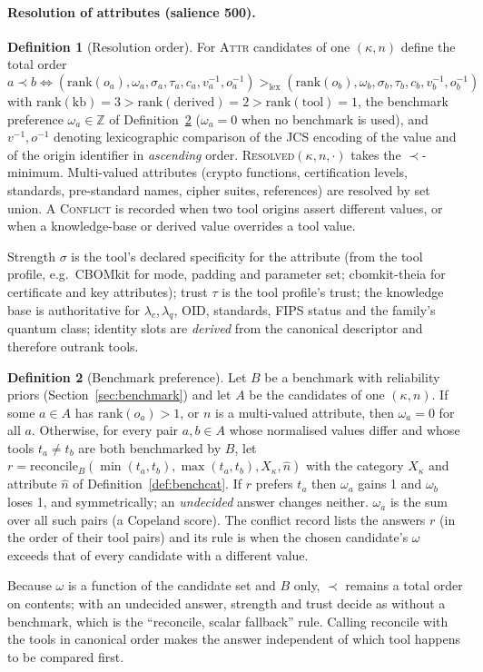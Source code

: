 \documentclass[11pt,a4paper]{article}
\theoremstyle{definition}
\newtheorem{definition}{Definition}[section]
\theoremstyle{plain}
\begin{document}
\paragraph{Resolution of attributes (salience 500).}
\begin{definition}[Resolution order]\label{def:order}
For \textsc{Attr} candidates of one $(\kappa, n)$ define the total order
$$a \prec b \iff (\text{rank}(o_a), \omega_a, \sigma_a, \tau_a, c_a, v_a^{-1}, o_a^{-1}) >_{\mathrm{lex}} (\text{rank}(o_b), \omega_b, \sigma_b, \tau_b, c_b, v_b^{-1}, o_b^{-1})$$
with $\text{rank}(\text{kb}) = 3 > \text{rank}(\text{derived}) = 2 > \text{rank}(\text{tool}) = 1$,
the benchmark preference $\omega_a \in \mathbb{Z}$ of Definition~\ref{def:benchpref} ($\omega_a = 0$
when no benchmark is used),
and $v^{-1}, o^{-1}$ denoting lexicographic comparison of the JCS encoding of the value and of
the origin identifier in \emph{ascending} order. \textsc{Resolved}$(\kappa,n,\cdot)$ takes the
$\prec$-minimum. Multi-valued attributes (crypto functions, certification levels, standards,
pre-standard names, cipher suites, references) are resolved by set union. A \textsc{Conflict} is
recorded when two tool origins assert different values, or when a knowledge-base or derived
value overrides a tool value.
\end{definition}
Strength $\sigma$ is the tool's declared specificity for the attribute (from the tool profile,
e.g.\ CBOMkit for mode, padding and parameter set; cbomkit-theia for certificate and key
attributes); trust $\tau$ is the tool profile's trust; the knowledge base is authoritative for
$\lambda_c, \lambda_q$, OID, standards, FIPS status and the family's quantum class; identity
slots are \emph{derived} from the canonical descriptor and therefore outrank tools.

\begin{definition}[Benchmark preference]\label{def:benchpref}
Let $B$ be a benchmark with reliability priors (Section~\ref{sec:benchmark}) and let $A$ be the
candidates of one $(\kappa, n)$. If some $a \in A$ has $\text{rank}(o_a) > 1$, or $n$ is a
multi-valued attribute, then $\omega_a = 0$ for all $a$. Otherwise, for every pair $a, b \in A$ whose
normalised values differ and whose tools $t_a \ne t_b$ are both benchmarked by $B$, let
$r = \mathrm{reconcile}_B(\min(t_a,t_b), \max(t_a,t_b), X_\kappa, \hat n)$ with the category
$X_\kappa$ and attribute $\hat n$ of Definition~\ref{def:benchcat}. If $r$ prefers $t_a$ then
$\omega_a$ gains 1 and $\omega_b$ loses 1, and symmetrically; an \emph{undecided} answer changes
neither. $\omega_a$ is the sum over all such pairs (a Copeland score). The conflict record lists the
answers $r$ (in the order of their tool pairs) and its rule is 
when the chosen candidate's $\omega$ exceeds that of every candidate with a different value.
\end{definition}
Because $\omega$ is a function of the candidate set and $B$ only, $\prec$ remains a total order on
contents; with an undecided answer, strength and trust decide as without a benchmark, which is the
``reconcile, scalar fallback'' rule. Calling $\mathrm{reconcile}$ with the tools in canonical order
makes the answer independent of which tool happens to be compared first.
\end{document}
